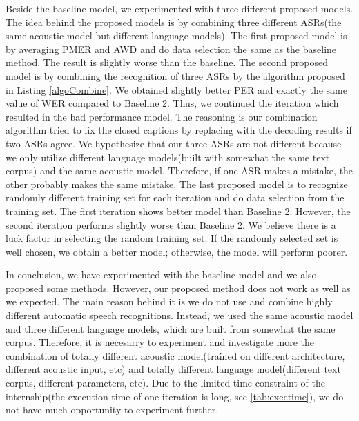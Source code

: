 Beside the baseline model, we experimented with three different proposed models. The idea behind the proposed models is by combining three different ASRs(the same acoustic model but different language models). The first proposed model is by averaging PMER and AWD and do data selection the same as the baseline method. The result is slightly worse than the baseline. The second proposed model is by combining the recognition of three ASRs by the algorithm proposed in Listing \ref{algoCombine}. We obtained slightly better PER and exactly the same value of WER compared to Baseline 2. Thus, we continued the iteration which resulted in the bad performance model. The reasoning is our combination algorithm tried to fix the closed captions by replacing with the decoding results if two ASRs agree. We hypothesize that our three ASRs are not different because we only utilize different language models(built with somewhat the same text corpus) and the same acoustic model. Therefore, if one ASR makes a mistake, the other probably makes the same mistake. The last proposed model is to recognize  randomly different training set for each iteration and do data selection from the training set. The first iteration shows better model than Baseline 2. However, the second iteration performs slightly worse than Baseline 2. We believe there is a luck factor in selecting the random training set. If the randomly selected set is well chosen, we obtain a better model; otherwise, the model will perform poorer. 

In conclusion, we have experimented with the baseline model and we also proposed some methods. However, our proposed method does not work as well as we expected. The main reason behind it is we do not use and combine highly different automatic speech recognitions. Instead, we used the same acoustic model and three different language models, which are built from somewhat the same corpus. Therefore, it is necesarry to experiment and investigate more the combination of totally different acoustic model(trained on different architecture, different acoustic input, etc) and totally different language model(different text corpus, different parameters, etc). Due to the limited time constraint of the internship(the execution time of one iteration is long, see \ref{tab:exectime}), we do not have much opportunity to experiment further.



